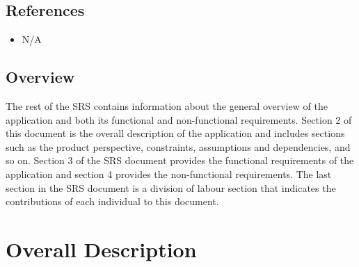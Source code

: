 \documentclass[]{article}
\begin{document}
\subsection{References}
\label{sub:references}
\begin{itemize}
	\item N/A
\end{itemize}

\subsection{Overview}
\label{sub:overview}

The rest of the SRS contains information about the general overview of the application and both its functional and non-functional requirements. Section 2 of this document is the overall description of the application and includes sections such as the product perspective, constraints, assumptions and dependencies, and so on. Section 3 of the SRS document provides the functional requirements of the application and section 4 provides the non-functional requirements. The last section in the SRS document is a division of labour section that indicates the contributions of each individual to this document.



\section{Overall Description}
\label{sec:overall_description}


\cbstart
\end{document}
